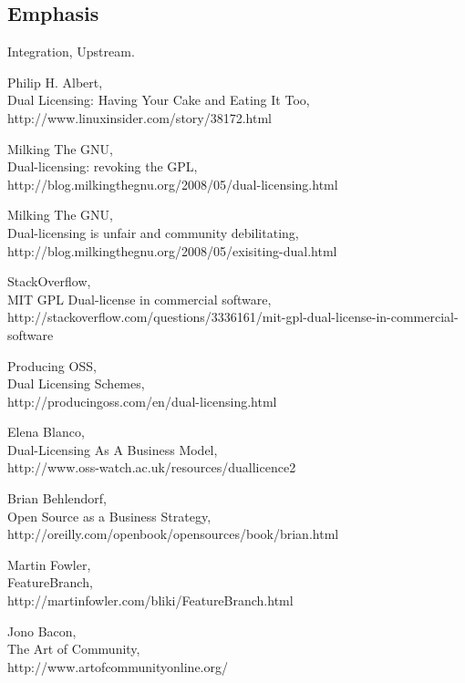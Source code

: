 \documentclass[11pt]{scrartcl}
\begin{document}

\subsection{Emphasis}
\label{sub:emphasis}

\par Integration, Upstream.


\begin{thebibliography}{9}

    Philip H. Albert,\\
    Dual Licensing: Having Your Cake and Eating It Too,\\
    http://www.linuxinsider.com/story/38172.html

    Milking The GNU,\\
    Dual-licensing: revoking the GPL,\\
    http://blog.milkingthegnu.org/2008/05/dual-licensing.html

    Milking The GNU,\\
    Dual-licensing is unfair and community debilitating,\\
    http://blog.milkingthegnu.org/2008/05/exisiting-dual.html

    StackOverflow,\\
    MIT GPL Dual-license in commercial software,\\
    http://stackoverflow.com/questions/3336161/mit-gpl-dual-license-in-commercial-software

    Producing OSS,\\
    Dual Licensing Schemes,\\
    http://producingoss.com/en/dual-licensing.html

    Elena Blanco,\\
    Dual-Licensing As A Business Model,\\
    http://www.oss-watch.ac.uk/resources/duallicence2

    Brian Behlendorf,\\
    Open Source as a Business Strategy,\\
    http://oreilly.com/openbook/opensources/book/brian.html
    
    Martin Fowler,\\
    FeatureBranch,\\
    http://martinfowler.com/bliki/FeatureBranch.html
    
    Jono Bacon,\\
    The Art of Community,\\
    http://www.artofcommunityonline.org/
\end{thebibliography}
\end{document}
